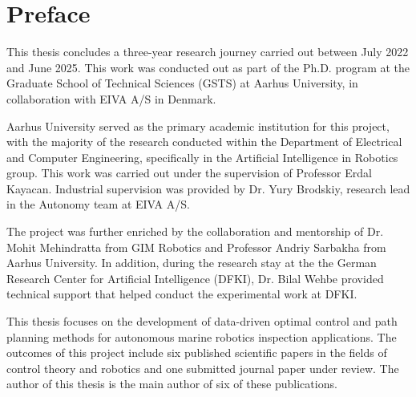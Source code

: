 

\chapter*{Preface}
This thesis concludes a three-year research journey carried out between July 2022 and June 2025. This work was conducted out as part of the Ph.D. program at the Graduate School of Technical Sciences (GSTS) at Aarhus University, in collaboration with EIVA A/S in Denmark. 

Aarhus University served as the primary academic institution for this project, with the majority of the research conducted within the Department of Electrical and Computer Engineering, specifically in the Artificial Intelligence in Robotics group. This work was carried out under the supervision of Professor Erdal Kayacan. Industrial supervision was provided by Dr. Yury Brodskiy, research lead in the Autonomy team at EIVA A/S. 

The project was further enriched by the collaboration and mentorship of Dr. Mohit Mehindratta from GIM Robotics and Professor Andriy Sarbakha from Aarhus University. In addition, during the research stay at the the German Research Center for Artificial Intelligence (DFKI), Dr. Bilal Wehbe provided technical support that helped conduct the experimental work at DFKI.

This thesis focuses on the development of data-driven optimal control and path planning methods for autonomous marine robotics inspection applications. The outcomes of this project include six published scientific papers in the fields of control theory and robotics and one submitted journal paper under review. The author of this thesis is the main author of six of these publications.



